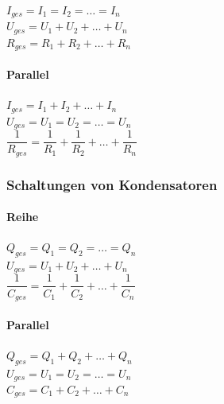 \documentclass[a4paper]{article}
\begin{document}
\begin{center}
	\Large
		$I_{ges} = I_1 = I_2 = … = I_n$\\[0,5cm]
		$U_{ges} = U_1 + U_2 + … + U_n$\\[0,5cm]
		$R_{ges} = R_1 + R_2 + … + R_n$\\[1cm]
	\normalsize
\end{center}


\paragraph{Parallel}

\begin{center}
	\Large
		$I_{ges} = I_1 + I_2 + … + I_n$\\[0,5cm]
		$U_{ges} = U_1 = U_2 = … = U_n$\\[0,5cm]
		$\dfrac{1}{R_{ges}} = \dfrac{1}{R_1} + \dfrac{1}{R_2} + … + \dfrac{1}{R_n}$\\[1cm]
	\normalsize
\end{center}



\subsubsection{Schaltungen von Kondensatoren}

\paragraph{Reihe}

\begin{center}
	\Large
		$Q_{ges} = Q_1 = Q_2 = … = Q_n$\\[0,5cm]
		$U_{ges} = U_1 + U_2 + … + U_n$\\[0,5cm]
		$\dfrac{1}{C_{ges}} = \dfrac{1}{C_1} + \dfrac{1}{C_2} + … + \dfrac{1}{C_n}$\\[1cm]
	\normalsize
\end{center}


\paragraph{Parallel}

\begin{center}
	\Large
		$Q_{ges} = Q_1 + Q_2 + … + Q_n$\\[0,5cm]
		$U_{ges} = U_1 = U_2 = … = U_n$\\[0,5cm]
		$C_{ges} = C_1 + C_2 + … + C_n$\\[1cm]
	\normalsize
\end{center}
\end{document}
